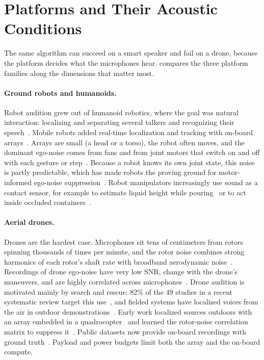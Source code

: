 \section{Platforms and Their Acoustic Conditions}
\label{sec:platforms}

The same algorithm can succeed on a smart speaker and fail on a drone, because the platform decides what the microphones hear.
 compares the three platform families along the dimensions that matter most.

\paragraph{Ground robots and humanoids.}
Robot audition grew out of humanoid robotics, where the goal was natural interaction: localizing and separating several talkers and recognizing their speech~\cite{nakadai2000active,nakadai2017hark}.
Mobile robots added real-time localization and tracking with on-board arrays~\cite{valin2003robust,valin2007tracking,grondin2019lightweight}.
Arrays are small (a head or a torso), the robot often moves, and the dominant ego-noise comes from fans and from joint motors that switch on and off with each gesture or step~\cite{ince2009template,schmidt2016dictionary}.
Because a robot knows its own joint state, this noise is partly predictable, which has made robots the proving ground for motor-informed ego-noise suppression~\cite{ince2009template,schmidt2018egonoise,schmidt2019informed}.
Robot manipulators increasingly use sound as a contact sensor, for example to estimate liquid height while pouring~\cite{liang2019pouring} or to act inside occluded containers~\cite{du2022playitbyear}.

\paragraph{Aerial drones.}
Drones are the hardest case.
Microphones sit tens of centimeters from rotors spinning thousands of times per minute, and the rotor noise combines strong harmonics of each rotor's shaft rate with broadband aerodynamic noise~\cite{strauss2018dregon,yen2023ncm}.
Recordings of drone ego-noise have very low SNR, change with the drone's maneuvers, and are highly correlated across microphones~\cite{ruizespitia2018aira}.
Drone audition is motivated mainly by search and rescue: 82\% of the 49 studies in a recent systematic review target this use~\cite{chevtchenko2025review}, and fielded systems have localized voices from the air in outdoor demonstrations~\cite{hoshiba2017uav}.
Early work localized sources outdoors with an array embedded in a quadrocopter~\cite{okutani2012quadrocopter} and learned the rotor-noise correlation matrix to suppress it~\cite{furukawa2013ncm}.
Public datasets now provide on-board recordings with ground truth~\cite{strauss2018dregon,wang2019avq,ruizespitia2018aira}.
Payload and power budgets limit both the array and the on-board compute.

